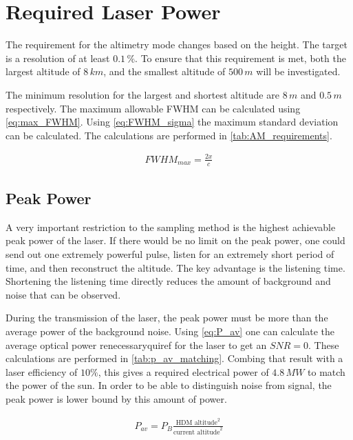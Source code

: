 \section{Required Laser Power} 
\label{ssec:required_laser_power}
The requirement for the altimetry mode changes based on the height. The target is a resolution of at least $0.1\,\%$. To ensure that this requirement is met, both the largest altitude of $8\,km$, and the smallest altitude of $500\,m$ will be investigated.

The minimum resolution for the largest and shortest altitude are $8\,m$ and $0.5\,m$ respectively. The maximum allowable FWHM can be calculated using \cref{eq:max_FWHM}.
 Using \cref{eq:FWHM_sigma} the maximum standard deviation can be calculated. The calculations are performed in \cref{tab:AM_requirements}.

\begin{align}\label{eq:max_FWHM}
FWHM_{max} = \frac{2x}{c}
\end{align}



\subsection{Peak Power}
A very important restriction to the sampling method is the highest achievable peak power of the laser. If there would be no limit on the peak power, one could send out one extremely powerful pulse, listen for an extremely short period of time, and then reconstruct the altitude. The key advantage is the listening time. Shortening the listening time directly reduces the amount of background and noise that can be observed. 

During the transmission of the laser, the peak power must be more than the average power of the background noise. Using \cref{eq:P_av} one can calculate the average optical power renecessaryquiref for the laser to get an $SNR=0$. These calculations are performed in \cref{tab:p_av_matching}. Combing that result with a laser efficiency of $10\%$, this gives a required electrical power of $4.8\,MW$ to match the power of the sun. In order to be able to distinguish noise from signal, the peak power is lower bound by this amount of power.

\begin{align}\label{eq:P_av}
P_{av} = P_B\frac{\text{HDM altitude}^2}{\text{current altitude}^2}
\end{align} 

